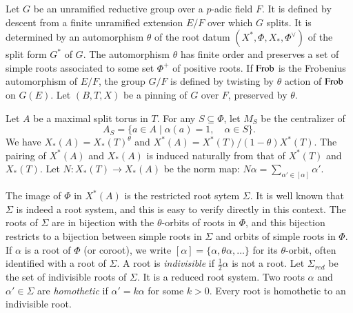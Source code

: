 Let $G$ be an unramified reductive group over a $p$-adic field $F$.  It is defined by
descent from a finite unramified extension $E/F$ over which $G$ splits.  It is determined by an automorphism
$\theta$ of the root datum $(X^*,\Phi,X_*,\Phi^\vee)$ of the split form $G^*$ of $G$.     
The automorphism $\theta$
has finite order and preserves a set of simple roots associated to some set $\Phi^+$ of positive roots.
If ${\operatorname{Frob}}$ is the Frobenius automorphism of $E/F$, the group $G/F$ is defined by twisting by $\theta$
action of ${\operatorname{Frob}}$ on $G(E)$.
Let $(B,T,X)$ be a pinning of $G$ over $F$, preserved by $\theta$.

Let $A$ be a maximal split torus in $T$.
For any $S\subseteq \Phi$,
let $M_S$
be the centralizer of 
\[
A_S = \{a\in A\mid \alpha(a)=1,\quad \alpha\in S\}.
\]
We have
$X_*(A) = X_*(T)^\theta$ and $X^*(A) = X^*(T)/(1-\theta)X^*(T)$.
The pairing of $X^*(A)$ and $X_*(A)$ is induced naturally from that of $X^*(T)$ and $X_*(T)$.
Let $N:X_*(T)\to X_*(A)$ be the norm map: $N\alpha = \sum_{\alpha'\in [\alpha]} \alpha'$.

The image of $\Phi$ in $X^*(A)$ is the restricted root sytem $\Sigma$.  
It is well known that $\Sigma$ is indeed a root system, and this is easy to
verify directly in this context.
The roots of $\Sigma$ are in bijection with the 
$\theta$-orbits of  roots in $\Phi$, and this bijection restricts to a bijection between
simple roots in $\Sigma$ and
 orbits of simple
roots in $\Phi$.
If $\alpha$ is a root of $\Phi$ (or coroot), we write 
$[\alpha]=\{\alpha,\theta\alpha,\ldots\}$ for its
$\theta$-orbit, often identified with a root of $\Sigma$.
A root is {\it indivisible} if $\frac12\alpha$ is not a root.
Let $\Sigma_{red}$ be the set of %
indivisible roots of $\Sigma$.
It is a reduced root system.
Two roots $\alpha$ and $\alpha'\in\Sigma$ are {\it homothetic} if $\alpha' = k\alpha$ for some $k>0$.
Every root is homothetic to an indivisible root.  %


